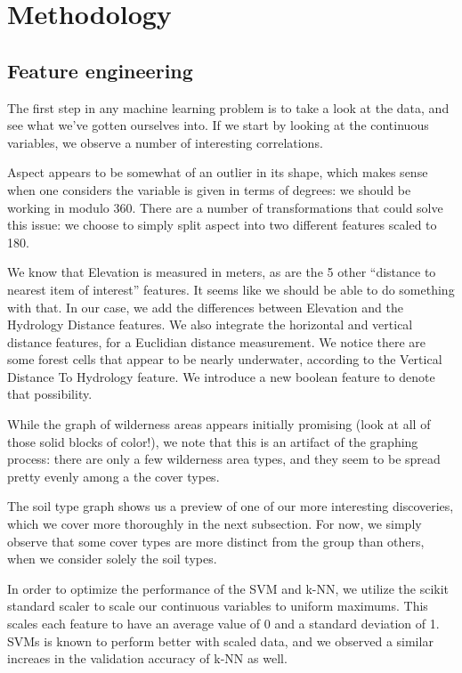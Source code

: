 \section{Methodology}
\label{sec:-method}


\subsection{Feature engineering}
The first step in any machine learning problem is to take a look at the 
data, and see what we've gotten ourselves into.  If we start by looking 
at the continuous variables, we observe a number of interesting 
correlations.  

Aspect appears to be somewhat of an outlier in its shape, 
which makes sense when one considers the variable is given in terms of 
degrees: we should be working in modulo 360.  There are a number of 
transformations that could solve this issue: we choose to simply split 
aspect into two different features scaled to 180\degree.

We know that Elevation is measured in meters, as are the 5 other 
``distance to nearest item of interest'' features.  It seems like we 
should be able to do something with that.  In our case, we add the 
differences between Elevation and the Hydrology Distance features.  We 
also integrate the horizontal and vertical distance features, for a 
Euclidian distance measurement. We notice there are some forest cells 
that appear to be nearly underwater, according to the Vertical Distance 
To Hydrology feature.  We introduce a new boolean feature to denote 
that possibility.  

While the graph of wilderness areas appears initially promising (look 
at all of those solid blocks of color!), we note that this is an 
artifact of the graphing process: there are only a few wilderness area 
types, and they seem to be spread pretty evenly among a the cover types.

The soil type graph shows us a preview of one of our more interesting 
discoveries, which we cover more thoroughly in the next subsection. For 
now, we simply observe that some cover types are more distinct from the 
group than others, when we consider solely the soil types.

In order to optimize the performance of the SVM and k-NN, we utilize the scikit 
standard scaler to scale our continuous variables to uniform maximums.  This scales
each feature to have an average value of 0 and a standard deviation of 1.  SVMs
is known to perform better with scaled data, and we observed a similar 
increaes in the validation accuracy of k-NN as well.

